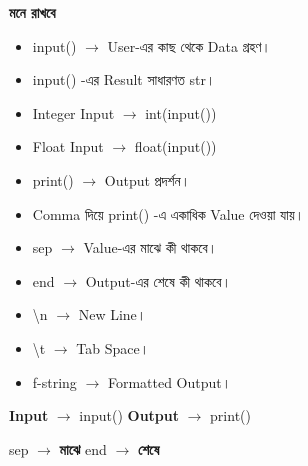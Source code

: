 
\begin{rememberbox}

\textbf{\color{deepOrange}মনে রাখবে}

\begin{itemize}

\item
\textenglish{\ttfamily input()}
\(\longrightarrow\)
User-এর কাছ থেকে Data গ্রহণ।

\item
\textenglish{\ttfamily input()}
-এর Result সাধারণত
\textenglish{\ttfamily str}।

\item
Integer Input
\(\longrightarrow\)
\textenglish{\ttfamily int(input())}

\item
Float Input
\(\longrightarrow\)
\textenglish{\ttfamily float(input())}

\item
\textenglish{\ttfamily print()}
\(\longrightarrow\)
Output প্রদর্শন।

\item
Comma দিয়ে
\textenglish{\ttfamily print()}
-এ একাধিক Value দেওয়া যায়।

\item
\textenglish{\ttfamily sep}
\(\longrightarrow\)
Value-এর মাঝে কী থাকবে।

\item
\textenglish{\ttfamily end}
\(\longrightarrow\)
Output-এর শেষে কী থাকবে।

\item
\textenglish{\ttfamily \textbackslash n}
\(\longrightarrow\)
New Line।

\item
\textenglish{\ttfamily \textbackslash t}
\(\longrightarrow\)
Tab Space।

\item
f-string
\(\longrightarrow\)
Formatted Output।

\end{itemize}

\begin{center}

\textbf{Input}
\(\longrightarrow\)
\textenglish{\ttfamily input()}
\qquad
\textbf{Output}
\(\longrightarrow\)
\textenglish{\ttfamily print()}

\medskip

\textenglish{\ttfamily sep}
\(\longrightarrow\)
\textbf{মাঝে}
\qquad
\textenglish{\ttfamily end}
\(\longrightarrow\)
\textbf{শেষে}

\end{center}

\end{rememberbox}

\small


